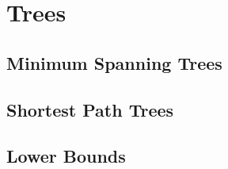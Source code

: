 \section{Trees}

\subsection{Minimum Spanning Trees}

\subsection{Shortest Path Trees}

\subsection{Lower Bounds}